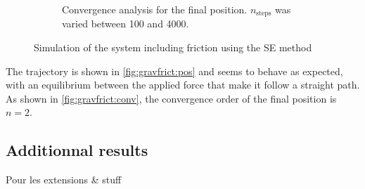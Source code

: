 \begin{figure}[h]
\begin{subfigure}{0.45\linewidth}
\begin{subfigure}{\linewidth}
        \end{subfigure}
        \caption{Convergence analysis for the final position. $n_\textrm{steps}$ was varied between 100 and 4000.}
        \label{fig:gravfrict:conv}
    \end{subfigure}
    \caption{Simulation of the system including friction using the SE method}
\end{figure}

The trajectory is shown in \autoref{fig:gravfrict:pos} and seems to behave as expected, with an equilibrium between the applied force that make it follow a straight path. As shown in \autoref{fig:gravfrict:conv}, the convergence order of the final position is $n=2$.

\subsection{Additionnal results}

Pour les extensions \& stuff

